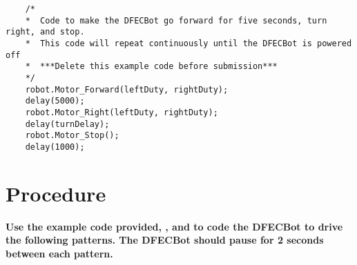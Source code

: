 \documentclass{handout}
\begin{document}
	\begin{lstlisting}
	/* 
	*  Code to make the DFECBot go forward for five seconds, turn right, and stop.
	*  This code will repeat continuously until the DFECBot is powered off
	*  ***Delete this example code before submission***
	*/
	robot.Motor_Forward(leftDuty, rightDuty);
	delay(5000);
	robot.Motor_Right(leftDuty, rightDuty);
	delay(turnDelay);
	robot.Motor_Stop();
	delay(1000);
	\end{lstlisting}
	
	\newpage
	\clearpage
	\pagebreak
	
	\section{Procedure}
	\textbf{Use the example code provided, , and  to code the DFECBot to drive the following patterns. The DFECBot should pause for 2 seconds between each pattern.}
		
\end{document}
